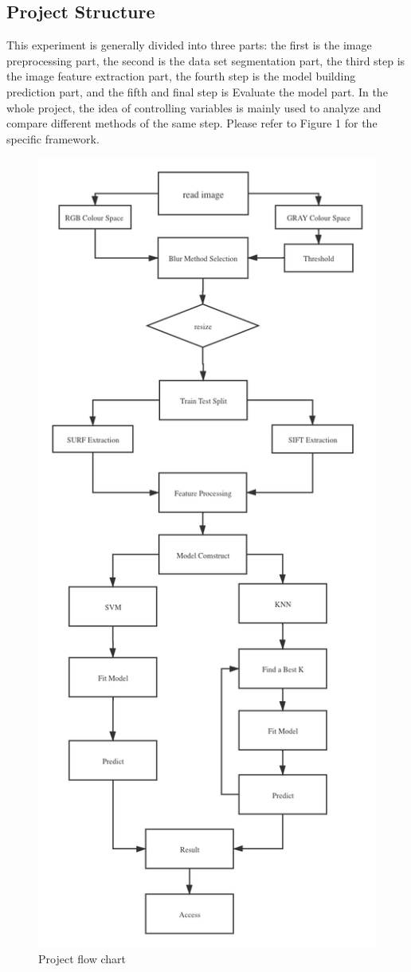 \documentclass[conference]{IEEEtran}
\begin{document}
\subsection{Project Structure}
This experiment is generally divided into three parts: the first is the image preprocessing part, the second is the data set segmentation part, the third step is the image feature extraction part, the fourth step is the model building prediction part, and the fifth and final step is Evaluate the model part. In the whole project, the idea of controlling variables is mainly used to analyze and compare different methods of the same step. Please refer to Figure 1 for the specific framework.
\begin{figure}[htbp]
\centerline{\includegraphics[scale=0.4]{P1.png}}
\caption{Project flow chart}
\label{fig1}
\end{figure}
\end{document}
